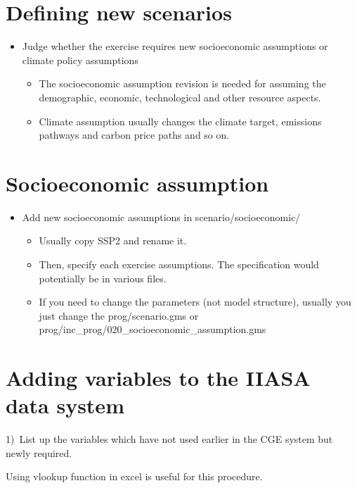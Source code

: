 \documentclass[10pt,a4paper,titlepage,dvipdfmx]{book}
\begin{document}
\section{\label{sec:DefNewSce}Defining new scenarios}


\begin{itemize}
\item Judge whether the exercise requires new socioeconomic assumptions or climate policy assumptions
\begin{itemize}
\item The socioeconomic assumption revision is needed for assuming the demographic, economic, technological and other resource aspects.
\item Climate assumption usually changes the climate target, emissions pathways and carbon price paths and so on.
\end{itemize}

\end{itemize}
\section{\label{sec:SomeTIPS-SocAss}Socioeconomic assumption}


\begin{itemize}
\item Add new socioeconomic assumptions in scenario/socioeconomic/
\begin{itemize}
\item Usually copy SSP2 and rename it.
\item Then, specify each exercise assumptions. The specification would potentially be in various files.

\item If you need to change the parameters (not model structure), usually you just change the prog/scenario.gms or prog/inc\_prog/020\_socioeconomic\_assumption.gms
\end{itemize}

\end{itemize}
\section{\label{sec:AddVarIIADatSys}Adding variables to the IIASA data system}

1)~List up the variables which have not used earlier in the CGE system but newly required.\label{mark-1)}

Using vlookup function in excel is useful for this procedure.
\end{document}

